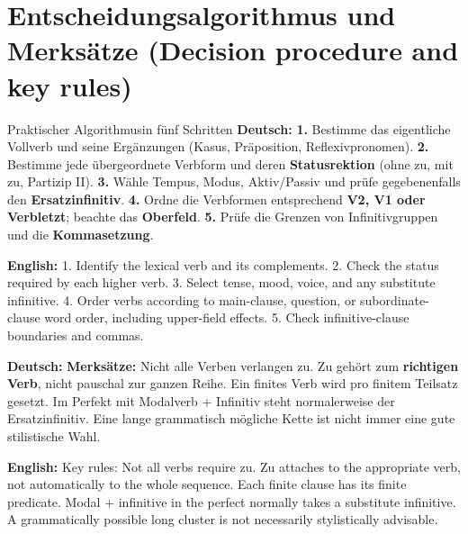 \documentclass[a4paper,11pt]{article}
\newcommand{\GermanText}[1]{\textbf{Deutsch: }#1\par}
\newcommand{\EnglishText}[1]{{\small\color{SoftGray}\textbf{English: }#1\par}}
\newcommand{\DEEN}[2]{\GermanText{#1}\EnglishText{#2}}
\begin{document}
\section{Entscheidungsalgorithmus und Merksätze \textnormal{(Decision procedure and key rules)}}
\begin{grammarentry}{Praktischer Algorithmus}{in fünf Schritten}
\DEEN{\textbf{1.} Bestimme das eigentliche Vollverb und seine Ergänzungen (Kasus, Präposition, Reflexivpronomen). \textbf{2.} Bestimme jede übergeordnete Verbform und deren \textbf{Statusrektion} (ohne zu, mit zu, Partizip II). \textbf{3.} Wähle Tempus, Modus, Aktiv/Passiv und prüfe gegebenenfalls den \textbf{Ersatzinfinitiv}. \textbf{4.} Ordne die Verbformen entsprechend \textbf{V2, V1 oder Verbletzt}; beachte das \textbf{Oberfeld}. \textbf{5.} Prüfe die Grenzen von Infinitivgruppen und die \textbf{Kommasetzung}.}{1. Identify the lexical verb and its complements. 2. Check the status required by each higher verb. 3. Select tense, mood, voice, and any substitute infinitive. 4. Order verbs according to main-clause, question, or subordinate-clause word order, including upper-field effects. 5. Check infinitive-clause boundaries and commas.}
\DEEN{\textbf{Merksätze:} Nicht alle Verben verlangen zu. Zu gehört zum \textbf{richtigen Verb}, nicht pauschal zur ganzen Reihe. Ein finites Verb wird pro finitem Teilsatz gesetzt. Im Perfekt mit Modalverb + Infinitiv steht normalerweise der Ersatzinfinitiv. Eine lange grammatisch mögliche Kette ist nicht immer eine gute stilistische Wahl.}{Key rules: Not all verbs require zu. Zu attaches to the appropriate verb, not automatically to the whole sequence. Each finite clause has its finite predicate. Modal + infinitive in the perfect normally takes a substitute infinitive. A grammatically possible long cluster is not necessarily stylistically advisable.}
\end{grammarentry}
\end{document}
